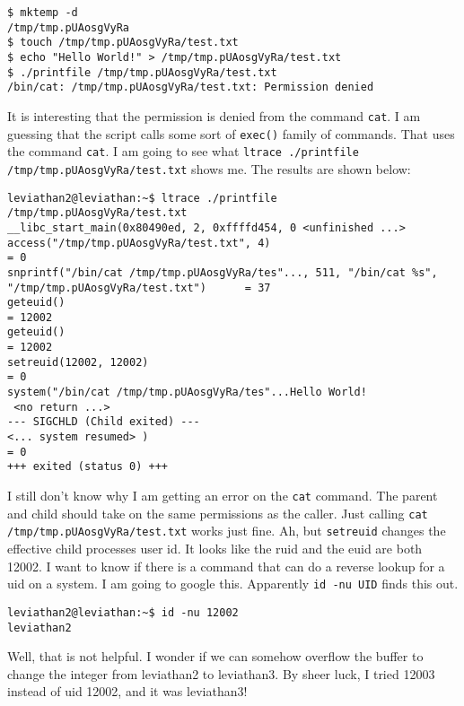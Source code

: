 \documentclass[11pt]{article}
\begin{document}
\begin{lstlisting} 
$ mktemp -d
/tmp/tmp.pUAosgVyRa
$ touch /tmp/tmp.pUAosgVyRa/test.txt
$ echo "Hello World!" > /tmp/tmp.pUAosgVyRa/test.txt
$ ./printfile /tmp/tmp.pUAosgVyRa/test.txt
/bin/cat: /tmp/tmp.pUAosgVyRa/test.txt: Permission denied
\end{lstlisting}

It is interesting that the permission is denied from the command \verb|cat|. I am guessing that the script calls some sort of \verb|exec()| family of commands. That uses the command \verb|cat|. I am going to see what \verb|ltrace ./printfile /tmp/tmp.pUAosgVyRa/test.txt| shows me. The results are shown below:

\begin{lstlisting} 
leviathan2@leviathan:~$ ltrace ./printfile /tmp/tmp.pUAosgVyRa/test.txt
__libc_start_main(0x80490ed, 2, 0xffffd454, 0 <unfinished ...>
access("/tmp/tmp.pUAosgVyRa/test.txt", 4)                                                                = 0
snprintf("/bin/cat /tmp/tmp.pUAosgVyRa/tes"..., 511, "/bin/cat %s", "/tmp/tmp.pUAosgVyRa/test.txt")      = 37
geteuid()                                                                                                = 12002
geteuid()                                                                                                = 12002
setreuid(12002, 12002)                                                                                   = 0
system("/bin/cat /tmp/tmp.pUAosgVyRa/tes"...Hello World!
 <no return ...>
--- SIGCHLD (Child exited) ---
<... system resumed> )                                                                                   = 0
+++ exited (status 0) +++
\end{lstlisting}

I still don't know why I am getting an error on the \verb|cat| command. The parent and child should take on the same permissions as the caller. Just calling \verb|cat /tmp/tmp.pUAosgVyRa/test.txt| works just fine. Ah, but \verb|setreuid| changes the effective child processes user id. It looks like the ruid and the euid are both 12002. I want to know if there is a command that can do a reverse lookup for a uid on a system. I am going to google this. Apparently \verb|id -nu UID| finds this out. 

\begin{lstlisting}
leviathan2@leviathan:~$ id -nu 12002
leviathan2
\end{lstlisting}

Well, that is not helpful. I wonder if we can somehow overflow the buffer to change the integer from leviathan2 to leviathan3. By sheer luck, I tried 12003 instead of uid 12002, and it was leviathan3!
\end{document}
